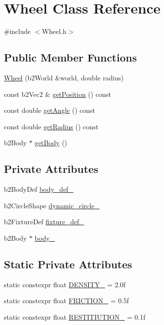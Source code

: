 \hypertarget{classWheel}{}\section{Wheel Class Reference}
\label{classWheel}


{\ttfamily \#include $<$Wheel.\+h$>$}

\subsection*{Public Member Functions}
\begin{DoxyCompactItemize}
\item 
\hyperlink{classWheel_a80d4c116370fe8edb97f2a3381e9f55b}{Wheel} (b2\+World \&world, double radius)
\item 
const b2\+Vec2 \& \hyperlink{classWheel_a645ce5d8595047c6774f936794e3f543}{get\+Position} () const
\item 
const double \hyperlink{classWheel_a5bc6a7580f38a4ea08ba8d1bff79178a}{get\+Angle} () const
\item 
const double \hyperlink{classWheel_a224ac73d325efb3cdc389a36d54ca10b}{get\+Radius} () const
\item 
b2\+Body $\ast$ \hyperlink{classWheel_af278d5423746dfc46834ec6b225d4e17}{get\+Body} ()
\end{DoxyCompactItemize}
\subsection*{Private Attributes}
\begin{DoxyCompactItemize}
\item 
b2\+Body\+Def \hyperlink{classWheel_a3ab427a9baabb06def9994e54c6adea4}{body\+\_\+def\+\_\+}
\item 
b2\+Circle\+Shape \hyperlink{classWheel_a9464768a2f778d0da93bd53e8beb7740}{dynamic\+\_\+circle\+\_\+}
\item 
b2\+Fixture\+Def \hyperlink{classWheel_a22109a794a3024cbc11b1e5fde8630d1}{fixture\+\_\+def\+\_\+}
\item 
b2\+Body $\ast$ \hyperlink{classWheel_a155ed4c915b672ca1dd3a6fdd51ff6e9}{body\+\_\+}
\end{DoxyCompactItemize}
\subsection*{Static Private Attributes}
\begin{DoxyCompactItemize}
\item 
static constexpr float \hyperlink{classWheel_afc6cf2c4e04f565ba581203878a358f0}{D\+E\+N\+S\+I\+T\+Y\+\_\+} = 2.\+0f
\item 
static constexpr float \hyperlink{classWheel_a714e23dd922b96909529cc611e515603}{F\+R\+I\+C\+T\+I\+O\+N\+\_\+} = 0.\+5f
\item 
static constexpr float \hyperlink{classWheel_ad8d457ae4fcae73501f37a35f044d024}{R\+E\+S\+T\+I\+T\+I\+U\+T\+I\+O\+N\+\_\+} = 0.\+1f
\end{DoxyCompactItemize}


